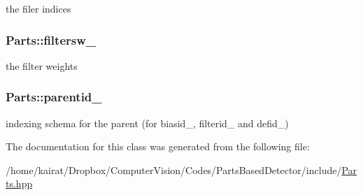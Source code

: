 the filer indices 

\hypertarget{classParts_a1de4d2cb595176d37aae609acbce88d8}{}
\subsubsection[{filtersw\+\_\+}]{ Parts\+::filtersw\+\_\+\hspace{0.3cm}{\ttfamily [private]}}\label{classParts_a1de4d2cb595176d37aae609acbce88d8}


the filter weights 

\hypertarget{classParts_ad74222c286ee6ee93659109a6d1d625f}{}
\subsubsection[{parentid\+\_\+}]{ Parts\+::parentid\+\_\+\hspace{0.3cm}{\ttfamily [private]}}\label{classParts_ad74222c286ee6ee93659109a6d1d625f}


indexing schema for the parent (for biasid\+\_\+, filterid\+\_\+ and defid\+\_\+) 



The documentation for this class was generated from the following file\+:\begin{DoxyCompactItemize}
\item 
/home/kairat/\+Dropbox/\+Computer\+Vision/\+Codes/\+Parts\+Based\+Detector/include/\hyperlink{Parts_8hpp}{Parts.\+hpp}\end{DoxyCompactItemize}
